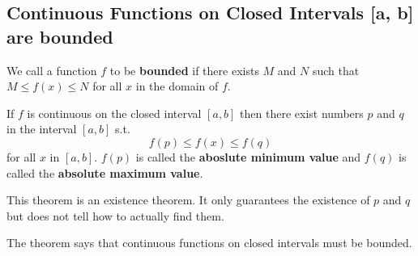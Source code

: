 \documentclass[../main.tex]{subfiles}
\begin{document}


\subsection*{Continuous Functions on Closed Intervals [a, b] are bounded}
We call a function $f$ to be \textbf{bounded} if there exists $M$ and $N$ such that $M \le f(x) \le N$ for all $x$ in the domain of $f$.

\begin{theorem}
    If $f$ is continuous on the closed interval $[a, b]$ then there exist numbers $p$ and $q$ in the interval $[a,b]$ s.t.
    \[
        f(p) \leq f(x) \leq f(q)
    \]
    for all $x$ in $[a, b]$.
    $f(p)$ is called the \textbf{aboslute minimum value} and $f(q)$ is called the \textbf{absolute maximum value}.
\end{theorem}

This theorem is an existence theorem. It only guarantees the existence of $p$ and $q$ but does not tell how to actually find them.

The theorem says that continuous functions on closed intervals must be bounded.
\end{document}
